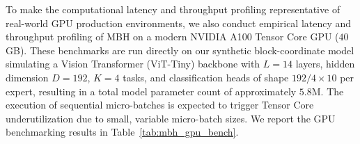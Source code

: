 To make the computational latency and throughput profiling representative of real-world GPU production environments, we also conduct empirical latency and throughput profiling of MBH on a modern NVIDIA A100 Tensor Core GPU ($40$GB). These benchmarks are run directly on our synthetic block-coordinate model simulating a Vision Transformer (ViT-Tiny) backbone with $L=14$ layers, hidden dimension $D=192$, $K=4$ tasks, and classification heads of shape $192/4 \times 10$ per expert, resulting in a total model parameter count of approximately $5.8$M. The execution of sequential micro-batches is expected to trigger Tensor Core underutilization due to small, variable micro-batch sizes. We report the GPU benchmarking results in Table~\ref{tab:mbh_gpu_bench}.

\begin{table}[h]
\caption{Empirical latency and throughput benchmarking of Micro-Batch Homogenization (MBH) on an NVIDIA A100 GPU.}
\label{tab:mbh_gpu_bench}
\vskip 0.15in
\begin{center}
\begin{small}
\begin{sc}
\end{sc}
\end{small}
\end{center}
\vskip -0.1in
\end{table}

